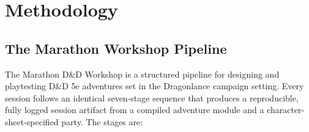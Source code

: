 
\section{Methodology}
\label{sec:methodology}

\subsection{The Marathon Workshop Pipeline}

The Marathon D\&D Workshop is a structured pipeline for designing and playtesting D\&D
5e adventures set in the Dragonlance campaign setting. Every session follows an
identical seven-stage sequence that produces a reproducible, fully logged session
artifact from a compiled adventure module and a character-sheet-specified party. The
stages are:

